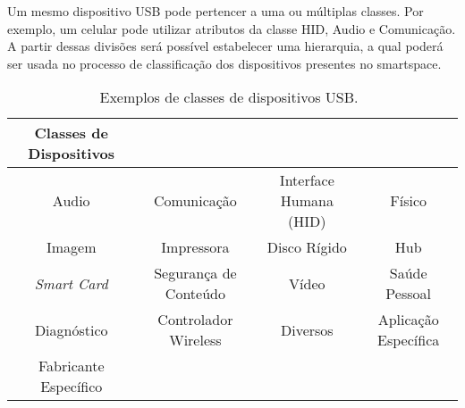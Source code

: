 Um mesmo dispositivo USB pode pertencer a uma ou múltiplas classes. Por exemplo, um celular pode utilizar atributos da classe HID, Audio e Comunicação. A partir dessas divisões será possível estabelecer uma hierarquia, a qual poderá ser usada no processo de classificação dos dispositivos presentes no smartspace.

\begin{table}
	\begin{center}
		\begin{tabular}{cccc}
		\hline
		\textbf{Classes de Dispositivos}																		\\
		\hline
		Audio					&	Comunicação				&	Interface Humana (HID)	&	Físico 				\\
		\hline
		Imagem					&	Impressora				&	Disco Rígido			&	Hub 				\\
		\hline
		\emph{Smart Card}		&	Segurança de Conteúdo	&	Vídeo					&	Saúde Pessoal 		\\
		\hline
		Diagnóstico				&	Controlador Wireless	&	Diversos				&	Aplicação Específica\\
		\hline
		Fabricante Específico	&							&							&						\\
		\hline
		\end{tabular}
	\end{center}
	\caption{Exemplos de classes de dispositivos USB.~\cite{usbclasscodes}}
	\label{tab:dispositivos_usb}
\end{table}

